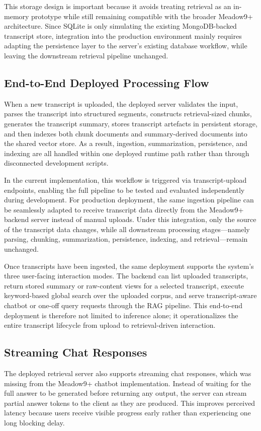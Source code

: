 This storage design is important because it avoids treating retrieval as an in-memory prototype while still remaining compatible with the broader Meadow9+ architecture. Since SQLite is only simulating the existing MongoDB-backed transcript store, integration into the production environment mainly requires adapting the persistence layer to the server's existing database workflow, while leaving the downstream retrieval pipeline unchanged.

\subsection{End-to-End Deployed Processing Flow}
When a new transcript is uploaded, the deployed server validates the input, parses the transcript into structured segments, constructs retrieval-sized chunks, generates the transcript summary, stores transcript artefacts in persistent storage, and then indexes both chunk documents and summary-derived documents into the shared vector store. As a result, ingestion, summarization, persistence, and indexing are all handled within one deployed runtime path rather than through disconnected development scripts.

In the current implementation, this workflow is triggered via transcript-upload endpoints, enabling the full pipeline to be tested and evaluated independently during development. For production deployment, the same ingestion pipeline can be seamlessly adapted to receive transcript data directly from the Meadow9+ backend server instead of manual uploads. Under this integration, only the source of the transcript data changes, while all downstream processing stages—namely parsing, chunking, summarization, persistence, indexing, and retrieval—remain unchanged.

Once transcripts have been ingested, the same deployment supports the system's three user-facing interaction modes. The backend can list uploaded transcripts, return stored summary or raw-content views for a selected transcript, execute keyword-based global search over the uploaded corpus, and serve transcript-aware chatbot or one-off query requests through the RAG pipeline. This end-to-end deployment is therefore not limited to inference alone; it operationalizes the entire transcript lifecycle from upload to retrieval-driven interaction.

\subsection{Streaming Chat Responses}
The deployed retrieval server also supports streaming chat responses, which was missing from the Meadow9+ chatbot implementation. Instead of waiting for the full answer to be generated before returning any output, the server can stream partial answer tokens to the client as they are produced. This improves perceived latency because users receive visible progress early rather than experiencing one long blocking delay.

